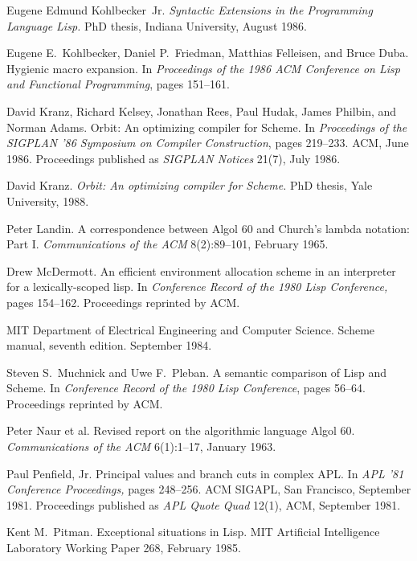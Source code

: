 \begin{thebibliography}{999}
Eugene Edmund Kohlbecker~Jr.
{\em Syntactic Extensions in the Programming Language Lisp.}
PhD thesis, Indiana University, August 1986.

Eugene E.~Kohlbecker, Daniel P.~Friedman, Matthias Felleisen, and Bruce Duba.
Hygienic macro expansion.
In {\em Proceedings of the 1986 ACM Conference on Lisp
  and Functional Programming}, pages 151--161.

David Kranz, Richard Kelsey, Jonathan Rees, Paul Hudak, James Philbin,
  and Norman Adams.
Orbit: An optimizing compiler for Scheme.
In {\em Proceedings of the SIGPLAN '86 Symposium on Compiler
  Construction}, pages 219--233.
ACM, June 1986.
Proceedings published as {\em SIGPLAN Notices} 21(7), July 1986.

David Kranz.
{\em Orbit: An optimizing compiler for Scheme.}
PhD thesis, Yale University, 1988.

Peter Landin.
A correspondence between Algol 60 and Church's lambda notation: Part I.
{\em Communications of the ACM} 8(2):89--101, February 1965.

Drew McDermott.
An efficient environment allocation scheme in an interpreter for a
  lexically-scoped lisp.
In {\em Conference Record of the 1980 Lisp Conference,} pages
  154--162.
Proceedings reprinted by ACM.

MIT Department of Electrical Engineering and Computer Science.
Scheme manual, seventh edition.
September 1984.

Steven S.~Muchnick and Uwe F.~Pleban.
A semantic comparison of Lisp and Scheme.
In {\em Conference Record of the 1980 Lisp Conference}, pages 56--64.
Proceedings reprinted by ACM.

Peter Naur et al.
Revised report on the algorithmic language Algol 60.
{\em Communications of the ACM} 6(1):1--17, January 1963.

Paul Penfield, Jr.
Principal values and branch cuts in complex APL.
In {\em APL '81 Conference Proceedings,} pages 248--256.
ACM SIGAPL, San Francisco, September 1981.
Proceedings published as {\em APL Quote Quad} 12(1), ACM, September 1981.


Kent M.~Pitman.
Exceptional situations in Lisp.
MIT Artificial Intelligence Laboratory Working Paper 268, February 1985.


\end{thebibliography}
